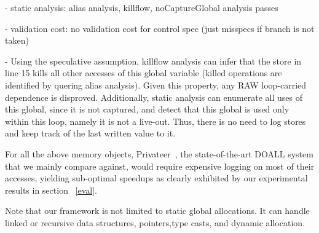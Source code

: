 - static analysis: alias analysis, killflow, noCaptureGlobal analysis passes

- validation cost: no validation cost for control spec (just misspecs if branch
  is not taken)

- Using the speculative assumption, killflow analysis can infer that the store
  in line 15 kills all other accesses of this global
variable (killed operations are identified by quering alias analysis). Given this
property, any RAW loop-carried dependence is disproved.  Additionally, static
analysis can enumerate all uses of this global, since it is not captured, and
detect that this global is used only within this loop, namely it is not a
live-out.  Thus, there is no need to log stores and keep track of the last
written value to it.


For all the above memory objects, Privateer~\cite{}, the state-of-the-art DOALL
system that we mainly compare against, would require expensive logging on most
of their accesses,
yielding sub-optimal speedups as clearly exhibited by our experimental results
in section ~\ref{eval}.

Note that our framework is not limited to static global allocations.  It can
handle linked or recursive data structures, pointers,type  casts,  and  dynamic
allocation.






